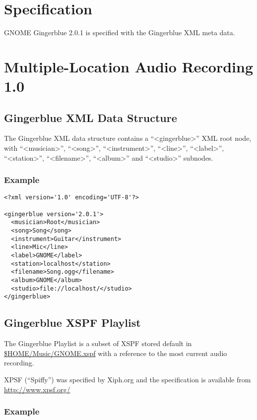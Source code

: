 \documentclass[UKenglish]{ifimaster}  %
\begin{document}
\chapter{Specification}

GNOME Gingerblue 2.0.1 is specified with the Gingerblue XML meta data.

\chapter{Multiple-Location Audio Recording 1.0}

\section{Gingerblue XML Data Structure}

\noindent The Gingerblue XML data structure contains a ``<gingerblue>'' XML root
node, with ``<musician>'', ``<song>'', ``<instrument>'', ``<line>'',
``<label>'', ``<station>'', ``<filename>'', ``<album>'' and
``<studio>'' subnodes.

\subsection{Example}

\begin{tiny}
\begin{verbatim}
<?xml version='1.0' encoding='UTF-8'?>

<gingerblue version='2.0.1'>
  <musician>Root</musician>
  <song>Song</song>
  <instrument>Guitar</instrument>
  <line>Mic</line>
  <label>GNOME</label>
  <station>localhost</station>
  <filename>Song.ogg</filename>
  <album>GNOME</album>
  <studio>file://localhost/</studio>
</gingerblue>
\end{verbatim}
\end{tiny}

\section{Gingerblue XSPF Playlist}

The Gingerblue Playlist is a subset of XSPF stored default in
\url{$HOME/Music/GNOME.xspf} with a reference to the most current
audio recording.

XPSF (``Spiffy'') was specified by Xiph.org and the specification is
available from \url{http://www.xpsf.org/}

\subsection{Example}
\end{document}
